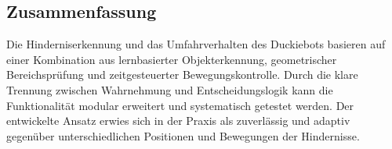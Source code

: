 \subsection{Zusammenfassung}
Die Hinderniserkennung und das Umfahrverhalten des Duckiebots basieren auf einer Kombination aus lernbasierter Objekterkennung, geometrischer Bereichsprüfung und zeitgesteuerter Bewegungskontrolle. Durch die klare Trennung zwischen Wahrnehmung und Entscheidungslogik kann die Funktionalität modular erweitert und systematisch getestet werden. Der entwickelte Ansatz erwies sich in der Praxis als zuverlässig und adaptiv gegenüber unterschiedlichen Positionen und Bewegungen der Hindernisse.






